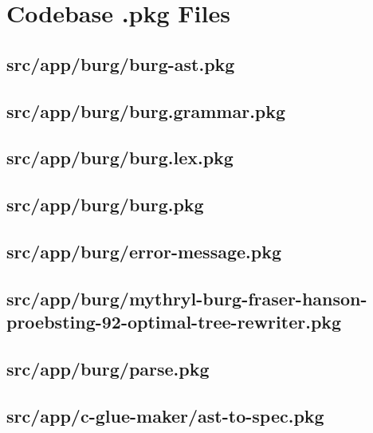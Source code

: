 \section{Codebase .pkg Files}



\subsection{src/app/burg/burg-ast.pkg}


\subsection{src/app/burg/burg.grammar.pkg}


\subsection{src/app/burg/burg.lex.pkg}


\subsection{src/app/burg/burg.pkg}


\subsection{src/app/burg/error-message.pkg}


\subsection{src/app/burg/mythryl-burg-fraser-hanson-proebsting-92-optimal-tree-rewriter.pkg}


\subsection{src/app/burg/parse.pkg}


\subsection{src/app/c-glue-maker/ast-to-spec.pkg}



